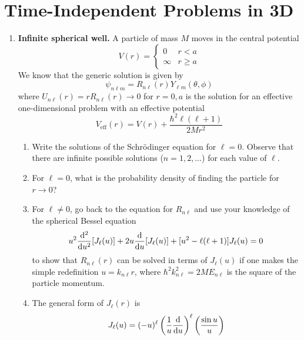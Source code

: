 \documentclass[../psets.tex]{subfiles}
\begin{document}
\section{Time-Independent Problems in 3D}
\begin{enumerate}
    \item {}\textbf{Infinite spherical well.} A particle of mass $M$ moves in the central potential
    \begin{equation}
        V(r) =
        \begin{cases}
            0 & r<a\\
            \infty & r\geq a
        \end{cases}
    \end{equation}
    We know that the generic solution is given by
    \begin{equation}
        \psi_{n\ell m} = R_{n\ell}(r)Y_{\ell m}(\theta,\phi)
    \end{equation}
    where $U_{n\ell}(r)=rR_{n\ell}(r)\to 0$ for $r=0,a$ is the solution for an effective one-dimensional problem with an effective potential
    \begin{equation}
        V_\text{eff}(r) = V(r)+\frac{\hbar^2\ell(\ell+1)}{2Mr^2}
    \end{equation}
    \begin{enumerate}
        \item Write the solutions of the Schr\"{o}dinger equation for $\ell=0$. Observe that there are infinite possible solutions ($n=1,2,\dots$) for each value of $\ell$.
        \item For $\ell=0$, what is the probability density of finding the particle for $r\to 0$?
        \item For $\ell\neq 0$, go back to the equation for $R_{n\ell}$ and use your knowledge of the spherical Bessel equation
        \begin{equation}
            u^2\dv[2]{u}[J_\ell(u)]+2u\dv{u}[J_\ell(u)]+[u^2-\ell(\ell+1)]J_\ell(u) = 0
        \end{equation}
        to show that $R_{n\ell}(r)$ can be solved in terms of $J_\ell(u)$ if one makes the simple redefinition $u=k_{n\ell}r$, where $\hbar^2k_{n\ell}^2=2ME_{n\ell}$ is the square of the particle momentum.
        \item The general form of $J_\ell(r)$ is
        \begin{equation}
            J_\ell(u) = (-u)^\ell\left( \frac{1}{u}\dv{u} \right)^\ell\left( \frac{\sin u}{u} \right)
        \end{equation}

\end{enumerate}
\end{enumerate}
\end{document}
